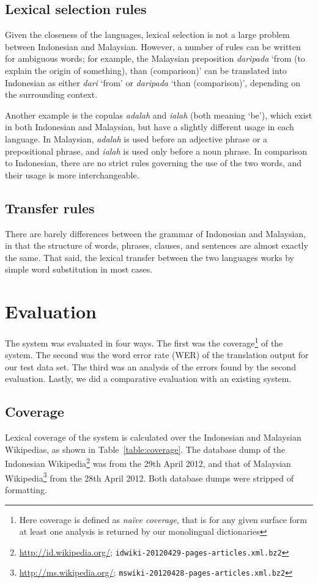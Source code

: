 \documentclass[10pt,a5paper,twoside]{article}
\begin{document}
\subsection{Lexical selection rules}
Given the closeness of the languages, lexical selection is not a large problem between Indonesian and Malaysian. However, a number of rules can be written for ambiguous words; for example, the Malaysian preposition \emph{daripada} `from (to explain the origin of something), than (comparison)' can be translated into Indonesian as either \emph{dari} `from' or \emph{daripada} `than (comparison)', depending on the surrounding context.

Another example is the copulas \emph{adalah} and \emph{ialah} (both meaning `be'), which exist in both Indonesian and Malaysian, but have a slightly different usage in each language. In Malaysian, \emph{adalah} is used before an adjective phrase or a prepositional phrase, and \emph{ialah} is used only before a noun phrase. In comparison to Indonesian, there are no strict rules governing the use of the two words, and their usage is more interchangeable.
\subsection{Transfer rules}
There are barely differences between the grammar of Indonesian and Malaysian, in that the structure of words, phrases, clauses, and sentences are almost exactly the same. That said, the lexical transfer between the two languages works by simple word substitution in most cases.

\section{Evaluation}
The system was evaluated in four ways. The first was the coverage\footnote{Here coverage is defined as \emph{na\"ive coverage}, that is for any given surface form at least one analysis is returned by our monolingual dictionaries} of the system. The second was the word error rate (WER) of the translation output for our test data set. The third was an analysis of the errors found by the second evaluation. Lastly, we did a comparative evaluation with an existing system.

\subsection{Coverage}
Lexical coverage of the system is calculated over the Indonesian and Malaysian Wikipedias, as shown in Table~\ref{table:coverage}. The database dump of the Indonesian Wikipedia\footnote{\url{http://id.wikipedia.org/}; \texttt{idwiki-20120429-pages-articles.xml.bz2}} was from the 29th April 2012, and that of Malaysian Wikipedia\footnote{\url{http://ms.wikipedia.org/}; \texttt{mswiki-20120428-pages-articles.xml.bz2}} from the 28th April 2012. Both database dumps were stripped of formatting.
\end{document}
